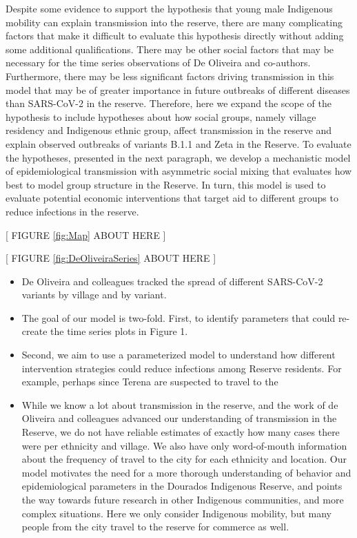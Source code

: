 \documentclass[
  letterpaper,
  abstract]{scrartcl}
\begin{document}
Despite some evidence to support the hypothesis that young male
Indigenous mobility can explain transmission into the reserve, there are
many complicating factors that make it difficult to evaluate this
hypothesis directly without adding some additional qualifications. 
There
may be other social factors that may be necessary for the time series
observations of De Oliveira and co-authors. 
Furthermore, there may be
less significant factors driving transmission in this model that may be
of greater importance in future outbreaks of different diseases than
SARS-CoV-2 in the reserve. 
Therefore, here we expand the scope of the
hypothesis to include hypotheses about how social groups, namely village
residency and Indigenous ethnic group, affect transmission in the
reserve and explain observed outbreaks of variants B.1.1 and Zeta in the
Reserve. To evaluate the hypotheses, presented in the next paragraph, we
develop a mechanistic model of epidemiological transmission with
asymmetric social mixing that evaluates how best to model group
structure in the Reserve. In turn, this model is used to evaluate
potential economic interventions that target aid to different groups to
reduce infections in the reserve.

\vspace{0.5em}
\begin{center}
{[ FIGURE \ref{fig:Map} ABOUT HERE ]} \\
\end{center}

\vspace{0.5em}
\begin{center}
{[ FIGURE \ref{fig:DeOliveiraSeries} ABOUT HERE ]} \\
\end{center}


\begin{itemize}
\item
  De Oliveira and colleagues tracked the spread of different SARS-CoV-2
  variants by village and by variant.
\item
  The goal of our model is two-fold. First, to identify parameters that
  could re-create the time series plots in Figure 1.
\item
  Second, we aim to use a parameterized model to understand how
  different intervention strategies could reduce infections among
  Reserve residents. For example, perhaps since Terena are suspected to
  travel to the
\item
  While we know a lot about transmission in the reserve, and the work of
  de Oliveira and colleagues advanced our understanding of transmission
  in the Reserve, we do not have reliable estimates of exactly how many
  cases there were per ethnicity and village. We also have only
  word-of-mouth information about the frequency of travel to the city
  for each ethnicity and location. Our model motivates the need for a
  more thorough understanding of behavior and epidemiological parameters
  in the Dourados Indigenous Reserve, and points the way towards future
  research in other Indigenous communities, and more complex situations.
  Here we only consider Indigenous mobility, but many people from the
  city travel to the reserve for commerce as well.
\end{itemize}
\end{document}
